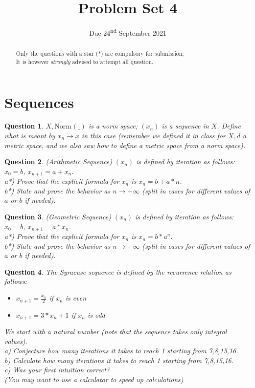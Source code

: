 \documentclass[]{article}
\title{Problem Set 4}
\author{}
\date{Due 24\textsuperscript{nd} September 2021}
\newtheorem{question}{Question}
\newcommand{\norm}[2][]{\text{Norm}_{#1}(#2)}
\begin{document}
\maketitle

\begin{abstract}
	Only the questions with a star (*) are compulsory for submission;\\
	It is however \textit{strongly} advised to attempt all question.
\end{abstract}

\section{Sequences}
\begin{question}
	$X,\norm{\_}$ is a norm space; $(x_n)$ is a sequence in $X$.
	Define what is meant by $x_n \to x$ in this case (remember we defined it in class for $X,d$ a metric space, and we also saw how to define a metric space from a norm space).
\end{question}

\begin{question}(Arithmetic Sequence)
	$(x_n)$ is defined by iteration as follows: $x_0=b$, $x_{n+1}=a+x_n$.\\
	a*) Prove that the explicit formula for $x_n$ is $x_n=b+a*n$.\\
	b*) State and prove the behavior as $n \to +\infty$ (split in cases for different values of $a$ or $b$ if needed).
\end{question}
\begin{question}(Geometric  Sequence)
	$(x_n)$ is defined by iteration as follows: $x_0=b$, $x_{n+1}=a*x_n$.\\
	a*) Prove that the explicit formula for $x_n$ is $x_n=b*a^n$.\\
	b*) State and prove the behavior as $n \to +\infty$ (split in cases for different values of $a$ or $b$ if needed).
\end{question}

\begin{question}
	The Syracuse sequence is defined by the recurrence relation as follows:
	\begin{itemize}
		\item $x_{n+1}=\frac{x_n}{2}$ if $x_n$ is even
		\item $x_{n+1}=3*x_n+1$ if $x_n$ is odd
	\end{itemize}
	We start with a natural number (note that the sequence takes only integral values).\\
	a) Conjecture how many iterations it takes to reach 1 starting from 7,8,15,16.\\
	b) Calculate how many iterations it takes to reach 1 starting from 7,8,15,16.\\
	c) Was your first intuition correct?\\
	(You may want to use a calculator to speed up calculations)
\end{question}
\end{document}
